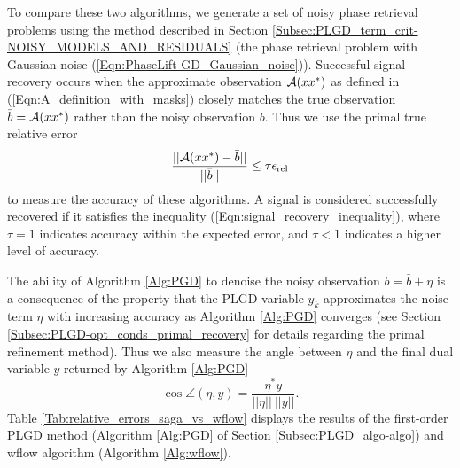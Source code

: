 To compare these two algorithms, we generate a set of noisy phase retrieval problems using the method described in Section \ref{Subsec:PLGD_term_crit-NOISY_MODELS_AND_RESIDUALS} (the phase retrieval problem with Gaussian noise (\ref{Eqn:PhaseLift-GD_Gaussian_noise})).
Successful signal recovery occurs when the approximate observation ${\mathcal A}(xx^*)$ as defined in (\ref{Eqn:A_definition_with_masks}) closely matches the true observation $\bar{b} = {\mathcal A}(\bar{x}\bar{x}^*)$ rather than the noisy observation $b$.  
Thus we use the primal true relative error 
\begin{equation} 	\label{Eqn:signal_recovery_inequality}
\frac{||{\mathcal A}(xx^*)-\bar{b}||}{ ||\bar{b}|| } \leq \tau \epsilon_{\textnormal{rel}}
\end{equation}
to measure the accuracy of these algorithms.  
A signal is considered successfully recovered if it satisfies the inequality (\ref{Eqn:signal_recovery_inequality}), where $\tau = 1$ indicates accuracy within the expected error, and $\tau < 1$ indicates a higher level of accuracy.  



The ability of Algorithm \ref{Alg:PGD} to denoise the noisy observation $b = \bar{b} + \eta$ is a consequence of the property that the PLGD variable $y_k$ approximates the noise term $\eta$ with increasing accuracy as Algorithm \ref{Alg:PGD} converges (see Section \ref{Subsec:PLGD-opt_conds_primal_recovery} for details regarding the primal refinement method).
Thus we also measure the angle between $\eta$ and the final dual variable $y$ returned by Algorithm \ref{Alg:PGD}
\begin{equation} 			\label{Eqn:angle_eta_y}
	\cos \angle (\eta, y)	=	\frac{\eta^*y}{||\eta|| \ ||y||}.
\end{equation}
Table \ref{Tab:relative_errors_saga_vs_wflow} displays the results of the first-order PLGD method (Algorithm \ref{Alg:PGD} of Section \ref{Subsec:PLGD_algo-algo}) and wflow algorithm (Algorithm \ref{Alg:wflow}).



